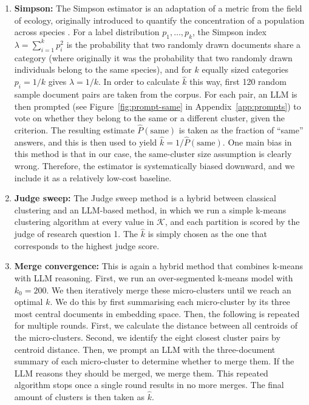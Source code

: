 \documentclass[11pt,a4paper,oneside]{report}
\begin{document}
\begin{enumerate}
\item \textbf{Simpson:} The Simpson estimator is an adaptation of a metric from the field of ecology, originally introduced to quantify the concentration of a population across species \citep{simpson1949measurement}. For a label distribution $p_1, \ldots, p_k$, the Simpson index $\lambda = \sum_{i=1}^{k} p_i^2$ is the probability that two randomly drawn documents share a category (where originally it was the probability that two randomly drawn individuals belong to the same species), and for $k$ equally sized categories $p_i = 1/k$ gives $\lambda = 1/k$. In order to calculate $\hat{k}$ this way, first 120 random sample document pairs are taken from the corpus. For each pair, an LLM is then prompted (see Figure~\ref{fig:prompt-same} in Appendix~\ref{app:prompts}) to vote on whether they belong to the same or a different cluster, given the criterion. The resulting estimate $\widehat{P}(\text{same})$ is taken as the fraction of ``same'' answers, and this is then used to yield $\hat{k} = 1/\widehat{P}(\text{same})$. One main bias in this method is that in our case, the same-cluster size assumption is clearly wrong. Therefore, the estimator is systematically biased downward, and we include it as a relatively low-cost baseline.
\item \textbf{Judge sweep:} The Judge sweep method is a hybrid between classical clustering and an LLM-based method, in which we run a simple k-means clustering algorithm at every value in $\mathcal{K}$, and each partition is scored by the judge of research question 1. The $\hat{k}$ is simply chosen as the one that corresponds to the highest judge score.
\item \textbf{Merge convergence:} This is again a hybrid method that combines k-means with LLM reasoning. First, we run an over-segmented k-means model with $k_0 = 200$. We then iteratively merge these micro-clusters until we reach an optimal $k$. We do this by first summarising each micro-cluster by its three most central documents in embedding space. Then, the following is repeated for multiple rounds. First, we calculate the distance between all centroids of the micro-clusters. Second, we identify the eight closest cluster pairs by centroid distance. Then, we prompt an LLM with the three-document summary of each micro-cluster to determine whether to merge them. If the LLM reasons they should be merged, we merge them. This repeated algorithm stops once a single round results in no more merges. The final amount of clusters is then taken as $\hat{k}$.
\end{enumerate}
\end{document}
